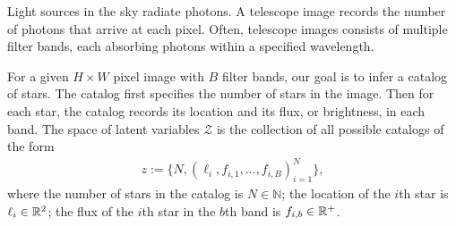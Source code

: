 Light sources in the sky radiate photons. A telescope image records the number of photons that arrive at each pixel. Often, telescope images consists of multiple filter bands, each absorbing photons within a specified wavelength. 

For a given $H \times W$ pixel image with $B$ filter bands, our goal is to infer a catalog of 
stars. 
The catalog first specifies the number of stars 
in the image. Then for each star, the catalog 
records its location and its flux, or brightness,
in each band. 
The space of latent variables 
$\mathcal{Z}$ is the collection of all possible catalogs of the form
\begin{align}
    z := \{N, (\ell_i, f_{i,1}, ..., f_{i,B})_{i = 1}^N\},
    \label{eq:cat_formulation}
\end{align}
where the number of stars in the catalog
is $N\in\mathbb{N}$;
the location of the $i$th star is $\ell_i \in \mathbb{R}^2$;
the flux of the $i$th star in the $b$th band is $f_{i, b}\in\mathbb{R}^+$. 


